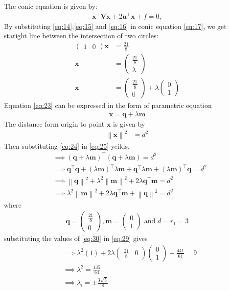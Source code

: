 \documentclass[12pt]{article}
\providecommand{\norm}[1]{\left\lVert#1\right\rVert}
\newcommand{\myvec}[1]{\ensuremath{\begin{pmatrix}#1\end{pmatrix}}}
\let\vec\mathbf
\let\vec\mathbf
\providecommand{\brak}[1]{\ensuremath{\left(#1\right)}}
\providecommand{\brak}[1]{\ensuremath{\left(#1\right)}}
\providecommand{\norm}[1]{\left\lVert#1\right\rVert}
\let\vec\mathbf
\begin{document}
The conic equation is given by:
 \begin{align}
 \vec{x}^\top\vec{V}\vec{x}+2\vec{u}^\top\vec{x}+f=0, 
  \label{eq:17}
 \end{align}
By substituting \eqref{eq:14},\eqref{eq:15} and \eqref{eq:16} in conic equation \eqref{eq:17}, we get staright line between the intersection of two circles:
\begin{align}
\myvec{1&0}\vec{x}&=\frac{21}{8}\\
\vec{x}&=\myvec{\frac{21}{8}\\\lambda}\\
\vec{x}&=\myvec{\frac{21}{8}\\0}+\lambda\myvec{0\\1}\label{eq:23}
\end{align}
		Equation \eqref{eq:23} can be expressed in the form of parametric equation
\begin{align}
	\vec{x}=\vec{q}+\lambda\vec{m}\label{eq:24}
\end{align}
The distance form origin to point $\vec{x}$ is given by
\begin{align}
	\norm{\vec{x}}^2&=d^2\label{eq:25}
\end{align}
		Then substituting \eqref{eq:24} in \eqref{eq:25} yeilds,
\begin{align}
	&\implies\brak{\vec{q}+\lambda\vec{m}}^{\top}\brak{\vec{q}+\lambda\vec{m}}=d^2\\
	&\implies \vec{q}^{\top}\vec{q}+\brak{\lambda\vec{m}}^{\top}\lambda\vec{m}+\vec{q}^{\top}\lambda\vec{m}+\brak{\lambda\vec{m}}^{\top}\vec{q}=d^2\\
	&\implies \norm{\vec{q}}^2+\lambda^2\norm{\vec{m}}^2+2\lambda\vec{q}^{\top}\vec{m}=d^2\\
	&\implies \lambda^2\norm{\vec{m}}^2+2\lambda\vec{q}^{\top}\vec{m}+\norm{\vec{q}}^2=d^2\label{eq:29}
\end{align}
where
\begin{align}
	\vec{q}=\myvec{\frac{21}{8}\\0},\vec{m}=\myvec{0\\1} \text{ and } d=r_1=3
	\label{eq:30}
\end{align}
		substituting the values of \eqref{eq:30} in \eqref{eq:29} gives
\begin{align}
	&\implies\lambda^2(1)+2\lambda\myvec{\frac{21}{8}&0}\myvec{0\\1}+\frac{441}{64}=9\\
	&\implies\lambda^2=\frac{135}{64}\\
	&\implies\lambda_i=\pm\frac{3\sqrt{5}}{8}
\end{align}
\end{document}
